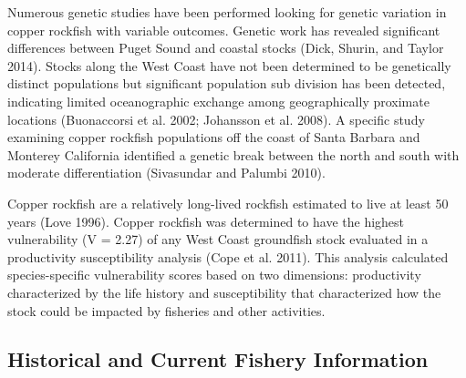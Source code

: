 \documentclass[11pt,
  english,
  a4paper,
]{article}
\begin{document}
\leavevmode\tagmcend\tagstructend\par


Numerous genetic studies have been performed looking for genetic variation in copper rockfish with variable outcomes. Genetic work has revealed significant differences between Puget Sound and coastal stocks {(Dick, Shurin, and Taylor 2014)\leavevmode\tagmcend\tagstructend}. Stocks along the West Coast have not been determined to be genetically distinct populations but significant population sub division has been detected, indicating limited oceanographic exchange among geographically proximate locations {(Buonaccorsi et al. 2002; Johansson et al. 2008)\leavevmode\tagmcend\tagstructend}. A specific study examining copper rockfish populations off the coast of Santa Barbara and Monterey California identified a genetic break between the north and south with moderate differentiation {(Sivasundar and Palumbi 2010)\leavevmode\tagmcend\tagstructend}.

\leavevmode\tagmcend\tagstructend\par


Copper rockfish are a relatively long-lived rockfish estimated to live at least 50 years {(Love 1996)\leavevmode\tagmcend\tagstructend}. Copper rockfish was determined to have the highest vulnerability (V = 2.27) of any West Coast groundfish stock evaluated in a productivity susceptibility analysis {(Cope et al. 2011)\leavevmode\tagmcend\tagstructend}. This analysis calculated species-specific vulnerability scores based on two dimensions: productivity characterized by the life history and susceptibility that characterized how the stock could be impacted by fisheries and other activities.

\leavevmode\tagmcend\tagstructend\par


\hypertarget{historical-and-current-fishery-information}{%
\subsection{Historical and Current Fishery Information}\label{historical-and-current-fishery-information}}
\end{document}
